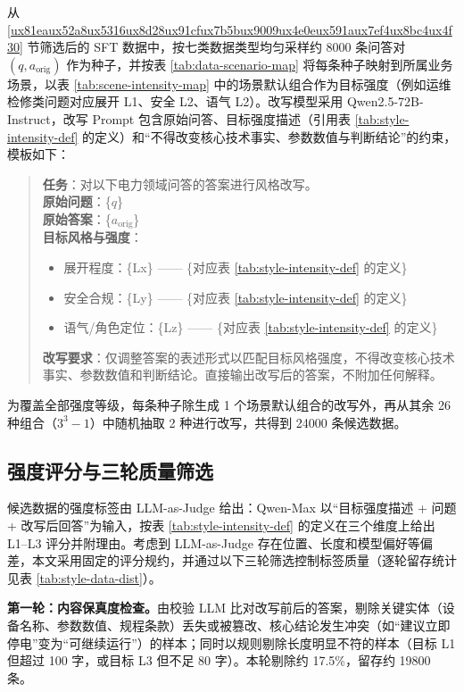\documentclass[fontset=fandol,type=master,campus=shenzhen,etitleauto=true]{hithesisbook}
\begin{document}
从 \ref{ux81eaux52a8ux5316ux8d28ux91cfux7b5bux9009ux4e0eux591aux7ef4ux8bc4ux4f30} 节筛选后的 SFT 数据中，按七类数据类型均匀采样约 8000 条问答对 $(q, a_{\text{orig}})$ 作为种子，并按表 \ref{tab:data-scenario-map} 将每条种子映射到所属业务场景，以表 \ref{tab:scene-intensity-map} 中的场景默认组合作为目标强度（例如运维检修类问题对应展开 L1、安全 L2、语气 L2）。改写模型采用 Qwen2.5-72B-Instruct，改写 Prompt 包含原始问答、目标强度描述（引用表 \ref{tab:style-intensity-def} 的定义）和“不得改变核心技术事实、参数数值与判断结论”的约束，模板如下：

\begin{quote}
\small
\textbf{任务}：对以下电力领域问答的答案进行风格改写。\\
\textbf{原始问题}：\{$q$\}\\
\textbf{原始答案}：\{$a_{\text{orig}}$\}\\
\textbf{目标风格与强度}：
\begin{itemize}
\item 展开程度：\{Lx\} —— \{对应表 \ref{tab:style-intensity-def} 的定义\}
\item 安全合规：\{Ly\} —— \{对应表 \ref{tab:style-intensity-def} 的定义\}
\item 语气/角色定位：\{Lz\} —— \{对应表 \ref{tab:style-intensity-def} 的定义\}
\end{itemize}
\textbf{改写要求}：仅调整答案的表述形式以匹配目标风格强度，不得改变核心技术事实、参数数值和判断结论。直接输出改写后的答案，不附加任何解释。
\end{quote}

为覆盖全部强度等级，每条种子除生成 1 个场景默认组合的改写外，再从其余 26 种组合（$3^3 - 1$）中随机抽取 2 种进行改写，共得到 24000 条候选数据。

\subsection{强度评分与三轮质量筛选}\label{ux4e09ux8f6eux8d28ux91cfux7b5bux9009}

候选数据的强度标签由 LLM-as-Judge 给出：Qwen-Max 以“目标强度描述 + 问题 + 改写后回答”为输入，按表 \ref{tab:style-intensity-def} 的定义在三个维度上给出 L1--L3 评分并附理由。考虑到 LLM-as-Judge 存在位置、长度和模型偏好等偏差\cite{ref65}，本文采用固定的评分规约，并通过以下三轮筛选控制标签质量（逐轮留存统计见表 \ref{tab:style-data-dist}）。

\textbf{第一轮：内容保真度检查。}由校验 LLM 比对改写前后的答案，剔除关键实体（设备名称、参数数值、规程条款）丢失或被篡改、核心结论发生冲突（如“建议立即停电”变为“可继续运行”）的样本；同时以规则剔除长度明显不符的样本（目标 L1 但超过 100 字，或目标 L3 但不足 80 字）。本轮剔除约 17.5\%，留存约 19800 条。
\end{document}

